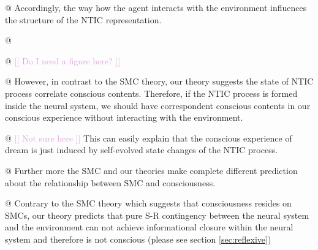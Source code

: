 \documentclass[utf8]{article}
\newenvironment{ants}
			{
			 \begin{easylist}[itemize]		
		 	}
			{
			\end{easylist}
			}
\newcommand{\idea}[2][Plum]{\noindent
				\textcolor{#1}{[[ #2 ]]}}
\begin{document}
\begin{ants}
				@ Accordingly, the way how the agent interacts with the environment influences the structure of the NTIC representation. 
				
				
				
				@ 
				
				@ \idea{Do I need a figure here?}				
				
				@ However, in contrast to the SMC theory, our theory suggests the state of NTIC process correlate conscious contents. Therefore, if the NTIC process is formed inside the neural system, we should have correspondent conscious contents in our conscious experience without interacting with the environment. 
				
				@ \idea{Not sure here} This can easily explain that the conscious experience of dream is just induced by self-evolved state changes of the NTIC process. 
				
				
				@ Further more the SMC and our theories make complete different prediction about the relationship between SMC and consciousness.
				
				@ Contrary to the SMC theory which suggests that consciousness resides on SMCs, our theory predicts that pure S-R contingency between the neural system and the environment can not achieve informational closure within the neural system and therefore is not conscious (please see section \ref{sec:reflexive})

				
			\end{ants}
\end{document}
